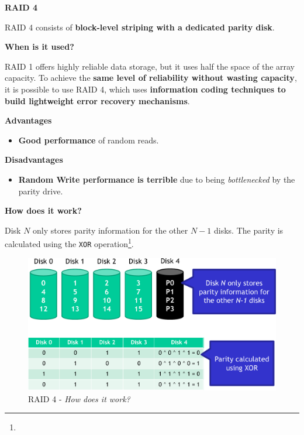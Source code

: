 \newpage

\begin{center}\label{RAID 4}
    \large
    \hypertarget{RAID 4}{\textcolor{Red2}{\textbf{RAID 4}}}
\end{center}

\noindent
RAID 4 consists of \textbf{block-level striping with a dedicated parity disk}.

\begin{flushleft}
    \textcolor{Green3}{ \textbf{When is it used?}}
\end{flushleft}
RAID 1 offers highly reliable data storage, but it uses half the space of the array capacity. To achieve the \textbf{same level of reliability without wasting capacity}, it is possible to use RAID 4, which uses \textbf{information coding techniques to build lightweight error recovery mechanisms}.

\highspace
\begin{flushleft}
    \textcolor{Green3}{ \textbf{Advantages}}
\end{flushleft}
\begin{itemize}
    \item \textbf{Good performance} of random reads.
\end{itemize}

\highspace
\begin{flushleft}
    \textcolor{Red2}{ \textbf{Disadvantages}}
\end{flushleft}
\begin{itemize}
    \item \textbf{Random Write performance is terrible} due to being \emph{bottlenecked} by the parity drive.
\end{itemize}

\highspace
\begin{flushleft}
    \textcolor{Green3}{ \textbf{How does it work?}}
\end{flushleft}
Disk $N$ only stores parity information for the other $N-1$ disks. The parity is calculated using the \texttt{XOR} operation\footnote{}.

\begin{figure}[!htp]
    \centering
    \includegraphics[width=\textwidth]{img/raid-6.pdf}
    \caption{RAID 4 - \emph{How does it work?}}
\end{figure}

